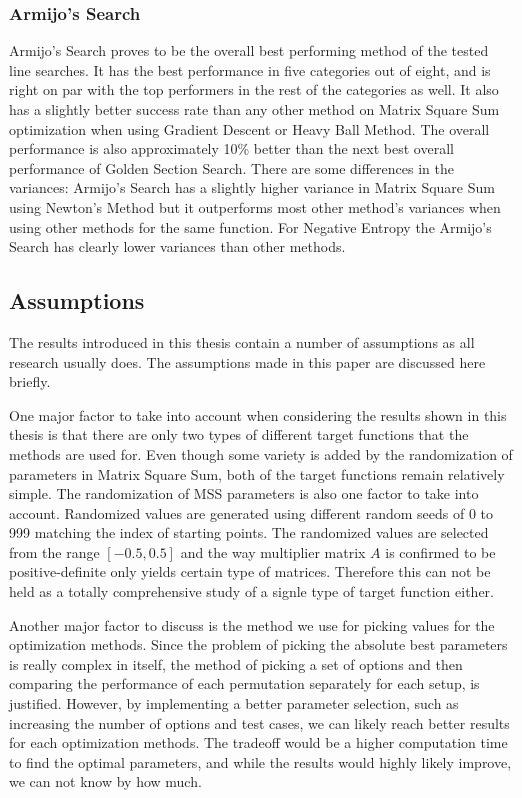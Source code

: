 \documentclass[a4paper,english,titlepage,12pt]{article}
\begin{document}
\subsubsection*{Armijo's Search}

Armijo's Search proves to be the overall best performing method of the tested line searches. It has the best performance in five categories out of eight, and is right on par with the top performers in the rest of the categories as well. It also has a slightly better success rate than any other method on Matrix Square Sum optimization when using Gradient Descent or Heavy Ball Method. The overall performance is also approximately 10\% better than the next best overall performance of Golden Section Search. There are some differences in the variances: Armijo's Search has a slightly higher variance in Matrix Square Sum using Newton's Method but it outperforms most other method's variances when using other methods for the same function. For Negative Entropy the Armijo's Search has clearly lower variances than other methods.

\subsection{Assumptions}

The results introduced in this thesis contain a number of assumptions as all research usually does. The assumptions made in this paper are discussed here briefly.

One major factor to take into account when considering the results shown in this thesis is that there are only two types of different target functions that the methods are used for. Even though some variety is added by the randomization of parameters in Matrix Square Sum, both of the target functions remain relatively simple. The randomization of MSS parameters is also one factor to take into account. Randomized values are generated using different random seeds of 0 to 999 matching the index of starting points. The randomized values are selected from the range $[-0.5, 0.5]$ and the way multiplier matrix $A$ is confirmed to be positive-definite only yields certain type of matrices. Therefore this can not be held as a totally comprehensive study of a signle type of target function either.

Another major factor to discuss is the method we use for picking values for the optimization methods. Since the problem of picking the absolute best parameters is really complex in itself, the method of picking a set of options and then comparing the performance of each permutation separately for each setup, is justified. However, by implementing a better parameter selection, such as increasing the number of options and test cases, we can likely reach better results for each optimization methods. The tradeoff would be a higher computation time to find the optimal parameters, and while the results would highly likely improve, we can not know by how much.
\end{document}
